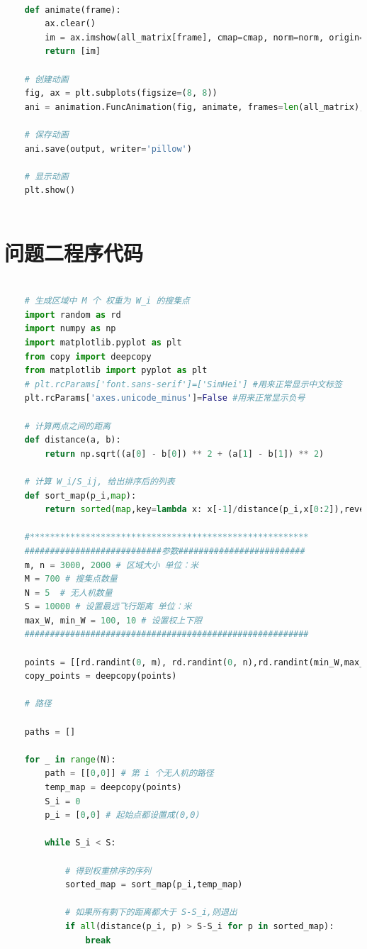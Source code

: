 \documentclass[bwprint]{gmcmthesis}
\numberwithin{figure}{section}
\begin{document}
\begin{lstlisting}[language=Python]
	
	def animate(frame):
		ax.clear()
		im = ax.imshow(all_matrix[frame], cmap=cmap, norm=norm, origin='lower')
		return [im]
	
	# 创建动画
	fig, ax = plt.subplots(figsize=(8, 8))
	ani = animation.FuncAnimation(fig, animate, frames=len(all_matrix), interval=5, blit=True)
	
	# 保存动画
	ani.save(output, writer='pillow')
	
	# 显示动画
	plt.show()
	
\end{lstlisting}

\appendix
\section{问题二程序代码}
\begin{lstlisting}[language=Python] 

	# 生成区域中 M 个 权重为 W_i 的搜集点
	import random as rd
	import numpy as np
	import matplotlib.pyplot as plt
	from copy import deepcopy
	from matplotlib import pyplot as plt
	# plt.rcParams['font.sans-serif']=['SimHei'] #用来正常显示中文标签
	plt.rcParams['axes.unicode_minus']=False #用来正常显示负号
	
	# 计算两点之间的距离
	def distance(a, b):
		return np.sqrt((a[0] - b[0]) ** 2 + (a[1] - b[1]) ** 2)
	
	# 计算 W_i/S_ij, 给出排序后的列表
	def sort_map(p_i,map):
		return sorted(map,key=lambda x: x[-1]/distance(p_i,x[0:2]),reverse=True)
	
	#*******************************************************
	###########################参数#########################
	m, n = 3000, 2000 # 区域大小 单位：米
	M = 700 # 搜集点数量 
	N = 5  # 无人机数量
	S = 10000 # 设置最远飞行距离 单位：米
	max_W, min_W = 100, 10 # 设置权上下限 
	########################################################
	
	points = [[rd.randint(0, m), rd.randint(0, n),rd.randint(min_W,max_W)] for _ in range(M)]
	copy_points = deepcopy(points)
	
	# 路径
	
	paths = []
	
	for _ in range(N):
		path = [[0,0]] # 第 i 个无人机的路径
		temp_map = deepcopy(points)
		S_i = 0
		p_i = [0,0] # 起始点都设置成(0,0)
	
		while S_i < S:
	
			# 得到权重排序的序列
			sorted_map = sort_map(p_i,temp_map)
	
			# 如果所有剩下的距离都大于 S-S_i,则退出
			if all(distance(p_i, p) > S-S_i for p in sorted_map):
				break
			 

\end{lstlisting}
\end{document}
